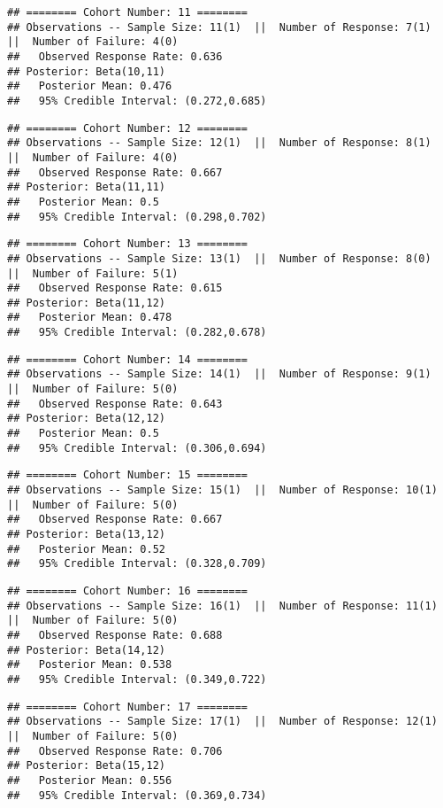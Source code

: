 \documentclass[]{article}
\begin{document}
\begin{verbatim}
## ======== Cohort Number: 11 ======== 
## Observations -- Sample Size: 11(1)  ||  Number of Response: 7(1)  ||  Number of Failure: 4(0)
##   Observed Response Rate: 0.636
## Posterior: Beta(10,11) 
##   Posterior Mean: 0.476
##   95% Credible Interval: (0.272,0.685)
\end{verbatim}

\begin{verbatim}
## ======== Cohort Number: 12 ======== 
## Observations -- Sample Size: 12(1)  ||  Number of Response: 8(1)  ||  Number of Failure: 4(0)
##   Observed Response Rate: 0.667
## Posterior: Beta(11,11) 
##   Posterior Mean: 0.5
##   95% Credible Interval: (0.298,0.702)
\end{verbatim}

\begin{verbatim}
## ======== Cohort Number: 13 ======== 
## Observations -- Sample Size: 13(1)  ||  Number of Response: 8(0)  ||  Number of Failure: 5(1)
##   Observed Response Rate: 0.615
## Posterior: Beta(11,12) 
##   Posterior Mean: 0.478
##   95% Credible Interval: (0.282,0.678)
\end{verbatim}

\begin{verbatim}
## ======== Cohort Number: 14 ======== 
## Observations -- Sample Size: 14(1)  ||  Number of Response: 9(1)  ||  Number of Failure: 5(0)
##   Observed Response Rate: 0.643
## Posterior: Beta(12,12) 
##   Posterior Mean: 0.5
##   95% Credible Interval: (0.306,0.694)
\end{verbatim}

\begin{verbatim}
## ======== Cohort Number: 15 ======== 
## Observations -- Sample Size: 15(1)  ||  Number of Response: 10(1)  ||  Number of Failure: 5(0)
##   Observed Response Rate: 0.667
## Posterior: Beta(13,12) 
##   Posterior Mean: 0.52
##   95% Credible Interval: (0.328,0.709)
\end{verbatim}

\begin{verbatim}
## ======== Cohort Number: 16 ======== 
## Observations -- Sample Size: 16(1)  ||  Number of Response: 11(1)  ||  Number of Failure: 5(0)
##   Observed Response Rate: 0.688
## Posterior: Beta(14,12) 
##   Posterior Mean: 0.538
##   95% Credible Interval: (0.349,0.722)
\end{verbatim}

\begin{verbatim}
## ======== Cohort Number: 17 ======== 
## Observations -- Sample Size: 17(1)  ||  Number of Response: 12(1)  ||  Number of Failure: 5(0)
##   Observed Response Rate: 0.706
## Posterior: Beta(15,12) 
##   Posterior Mean: 0.556
##   95% Credible Interval: (0.369,0.734)
\end{verbatim}
\end{document}
